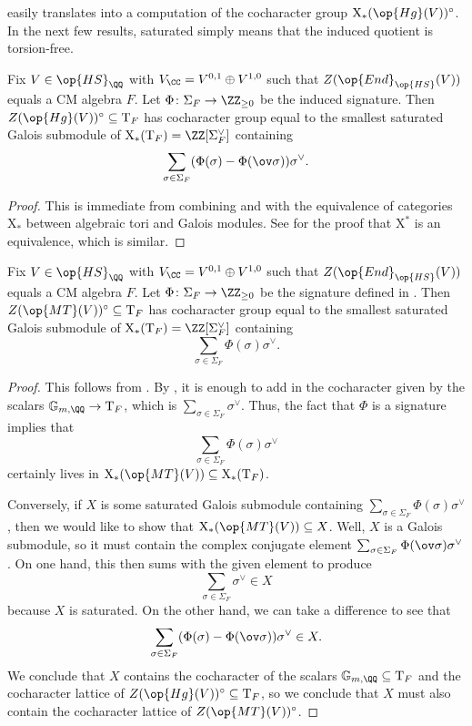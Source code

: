 \documentclass[../thesis.tex]{subfiles}
\begin{document}
 easily translates into a computation of the cocharacter group $\mathrm X_*(\op{Hg}(V))^\circ$. In the next few results, saturated simply means that the induced quotient is torsion-free.
\begin{corollary} \label{cor:compute-z-hg}
	Fix $V\in\op{HS}_\QQ$ with $V_\CC=V^{0,1}\oplus V^{1,0}$ such that $Z(\op{End}_{\op{HS}}(V))$ equals a CM algebra $F$. Let $\Phi\colon\Sigma_F\to\ZZ_{\ge0}$ be the induced signature. Then $Z(\op{Hg}(V))^\circ\subseteq\mathrm T_F$ has cocharacter group equal to the smallest saturated Galois submodule of $\mathrm X_*(\mathrm T_F)=\ZZ[\Sigma_F^\lor]$ containing
	\[\sum_{\sigma\in\Sigma_F}(\Phi(\sigma)-\Phi(\ov\sigma))\sigma^\lor.\]
\end{corollary}
\begin{proof}
	This is immediate from combining  and  with the equivalence of categories $\mathrm X_*$ between algebraic tori and Galois modules. See \cite[Theorem~12.23]{milne-alg-groups} for the proof that $\mathrm X^*$ is an equivalence, which is similar.
\end{proof}
\begin{corollary} \label{cor:compute-z-mt}
	Fix $V\in\op{HS}_\QQ$ with $V_\CC=V^{0,1}\oplus V^{1,0}$ such that $Z(\op{End}_{\op{HS}}(V))$ equals a CM algebra $F$. Let $\Phi\colon\Sigma_F\to\ZZ_{\ge0}$ be the signature defined in . Then $Z(\op{MT}(V))^\circ\subseteq\mathrm T_F$ has cocharacter group equal to the smallest saturated Galois submodule of $\mathrm X_*(\mathrm T_F)=\ZZ[\Sigma_F^\lor]$ containing
	\[\sum_{\sigma\in\Sigma_F}\Phi(\sigma)\sigma^\lor.\]
\end{corollary}
\begin{proof}
	This follows from . By , it is enough to add in the cocharacter given by the scalars $\mathbb G_{m,\QQ}\to\mathrm T_F$, which is $\sum_{\sigma\in\Sigma_F}\sigma^\lor$. Thus, the fact that $\Phi$ is a signature implies that
	\[\sum_{\sigma\in\Sigma_F}\Phi(\sigma)\sigma^\lor\]
	certainly lives in $\mathrm X_*(\op{MT}(V))\subseteq\mathrm X_*(\mathrm T_F)$.
	
	Conversely, if $X$ is some saturated Galois submodule containing $\sum_{\sigma\in\Sigma_F}\Phi(\sigma)\sigma^\lor$, then we would like to show that $\mathrm X_*(\op{MT}(V))\subseteq X$. Well, $X$ is a Galois submodule, so it must contain the complex conjugate element $\sum_{\sigma\in\Sigma_F}\Phi(\ov\sigma)\sigma^\lor$. On one hand, this then sums with the given element to produce
	\[\sum_{\sigma\in\Sigma_F}\sigma^\lor\in X\]
	because $X$ is saturated. On the other hand, we can take a difference to see that
	\[\sum_{\sigma\in\Sigma_F}(\Phi(\sigma)-\Phi(\ov\sigma))\sigma^\lor\in X.\]
	We conclude that $X$ contains the cocharacter of the scalars $\mathbb G_{m,\QQ}\subseteq\mathrm T_F$ and the cocharacter lattice of $Z(\op{Hg}(V))^\circ\subseteq\mathrm T_F$, so we conclude that $X$ must also contain the cocharacter lattice of $Z(\op{MT}(V))^\circ$.
\end{proof}
\end{document}
